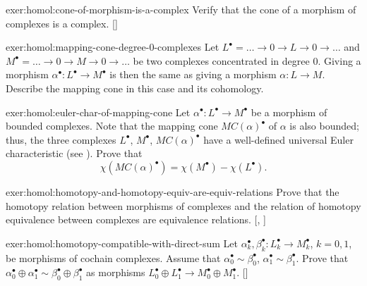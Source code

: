 \begin{exer}{\exerused{}}{exer:homol:cone-of-morphism-is-a-complex}
  Verify that the cone of a morphism of complexes is a complex.
  []
\end{exer}
\begin{exer}{}{exer:homol:mapping-cone-degree-0-complexes}
  Let $L^\bullet = \dots \to 0 \to L \to 0 \to \dots$ and
  $M^\bullet = \dots \to 0 \to M \to 0 \to \dots$ be two complexes
  concentrated in degree $0$. Giving a morphism
  $\alpha^\bullet : L^\bullet \to M^\bullet$ is then the same as
  giving a morphism $\alpha : L \to M$. Describe the mapping cone in
  this case and its cohomology.
\end{exer}
\begin{exer}{}{exer:homol:euler-char-of-mapping-cone}
  Let $\alpha^\bullet : L^\bullet \to M^\bullet$ be a morphism of
  bounded complexes. Note that the mapping cone $MC(\alpha)^\bullet$
  of $\alpha$ is also bounded; thus, the three complexes $L^\bullet$,
  $M^\bullet$, $MC(\alpha)^\bullet$ have a well-defined universal
  Euler characteristic (see
  ). Prove
  that
  \[
    \chi(MC(\alpha)^\bullet) = \chi(M^\bullet) - \chi(L^\bullet).
  \]
\end{exer}
\begin{exer}{\exerused{}}{exer:homol:homotopy-and-homotopy-equiv-are-equiv-relations}
  Prove that the homotopy relation between morphisms of complexes and
  the relation of homotopy equivalence between complexes are
  equivalence relations. [,
  ]
\end{exer}
\begin{exer}{\exerused{}}{exer:homol:homotopy-compatible-with-direct-sum}
  Let
  $\alpha_k^\bullet, \beta_k^\bullet : L^\bullet_k \to M_k^\bullet$,
  $k = 0, 1$, be morphisms of cochain complexes. Assume that
  $\alpha_0^\bullet \sim \beta_0^\bullet$,
  $\alpha_1^\bullet \sim \beta_1^\bullet$. Prove that
  $\alpha_0^\bullet \oplus \alpha_1^\bullet \sim \beta_0^\bullet \oplus
  \beta_1^\bullet$ as morphisms
  $L^\bullet_0 \oplus L^\bullet_1 \to M_0^\bullet \oplus M_1^\bullet$.
  []
\end{exer}
